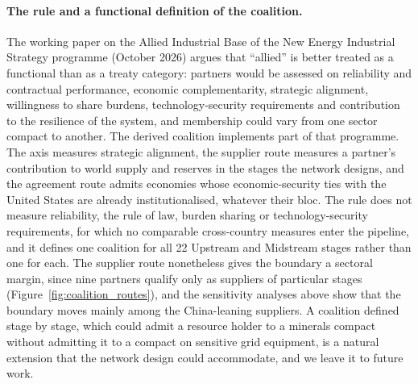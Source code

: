 \paragraph{The rule and a functional definition of the coalition.} The working paper on the Allied
Industrial Base of the New Energy Industrial Strategy programme (October 2026) argues that
``allied'' is better treated as a functional than as a treaty category: partners would be assessed
on reliability and contractual performance, economic complementarity, strategic alignment,
willingness to share burdens, technology-security requirements and contribution to the resilience
of the system, and membership could vary from one sector compact to another. The derived coalition
implements part of that programme. The axis measures strategic alignment, the supplier route
measures a partner's contribution to world supply and reserves in the stages the network designs,
and the agreement route admits economies whose economic-security ties with the United States are
already institutionalised, whatever their bloc. The rule does not measure reliability, the rule of
law, burden sharing or technology-security requirements, for which no comparable cross-country
measures enter the pipeline, and it defines one coalition for all 22 Upstream and Midstream stages
rather than one for each. The supplier route nonetheless gives the boundary a sectoral margin, since
nine partners qualify only as suppliers of particular stages (Figure~\ref{fig:coalition_routes}),
and the sensitivity analyses above show that the boundary moves mainly among the China-leaning
suppliers. A coalition defined stage by stage, which could admit a resource holder to a minerals
compact without admitting it to a compact on sensitive grid equipment, is a natural extension that
the network design could accommodate, and we leave it to future work.

